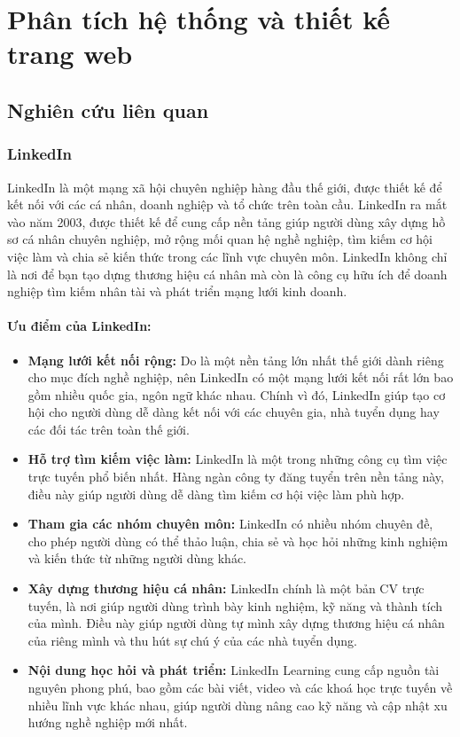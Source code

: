 \chapter{Phân tích hệ thống và thiết kế trang web}

\section{Nghiên cứu liên quan}

\subsection{LinkedIn}

LinkedIn là một mạng xã hội chuyên nghiệp hàng đầu thế giới, được thiết kế để kết nối với các cá nhân, doanh nghiệp và tổ chức trên toàn cầu. LinkedIn ra mắt vào năm 2003, được thiết kế để cung cấp nền tảng giúp người dùng xây dựng hồ sơ cá nhân chuyên nghiệp, mở rộng mối quan hệ nghề nghiệp, tìm kiếm cơ hội việc làm và chia sẻ kiến thức trong các lĩnh vực chuyên môn. LinkedIn không chỉ là nơi để bạn tạo dựng thương hiệu cá nhân mà còn là công cụ hữu ích để doanh nghiệp tìm kiếm nhân tài và phát triển mạng lưới kinh doanh.


\subsubsection{Ưu điểm của LinkedIn:}

\begin{itemize}
	\item \textbf{Mạng lưới kết nối rộng:} Do là một nền tảng lớn nhất thế giới dành riêng cho mục đích nghề nghiệp, nên LinkedIn có một mạng lưới kết nối rất lớn bao gồm nhiều quốc gia, ngôn ngữ khác nhau. Chính vì đó, LinkedIn giúp tạo cơ hội cho người dùng dễ dàng kết nối với các chuyên gia, nhà tuyển dụng hay các đối tác trên toàn thế giới.
	\item \textbf{Hỗ trợ tìm kiếm việc làm:} LinkedIn là một trong những công cụ tìm việc trực tuyến phổ biến nhất. Hàng ngàn công ty đăng tuyển trên nền tảng này, điều này giúp người dùng dễ dàng tìm kiếm cơ hội việc làm phù hợp.
	\item \textbf{Tham gia các nhóm chuyên môn:} LinkedIn có nhiều nhóm chuyên đề, cho phép người dùng có thể thảo luận, chia sẻ và học hỏi những kinh nghiệm và kiến thức từ những người dùng khác.
	\item \textbf{Xây dựng thương hiệu cá nhân:} LinkedIn chính là một bản CV trực tuyến, là nơi giúp người dùng trình bày kinh nghiệm, kỹ năng và thành tích của mình. Điều này giúp người dùng tự mình xây dựng thương hiệu cá nhân của riêng mình và thu hút sự chú ý của các nhà tuyển dụng.
	\item \textbf{Nội dung học hỏi và phát triển:} LinkedIn Learning cung cấp nguồn tài nguyên phong phú, bao gồm các bài viết, video và các khoá học trực tuyến về nhiều lĩnh vực khác nhau, giúp người dùng nâng cao kỹ năng và cập nhật xu hướng nghề nghiệp mới nhất.
\end{itemize}

